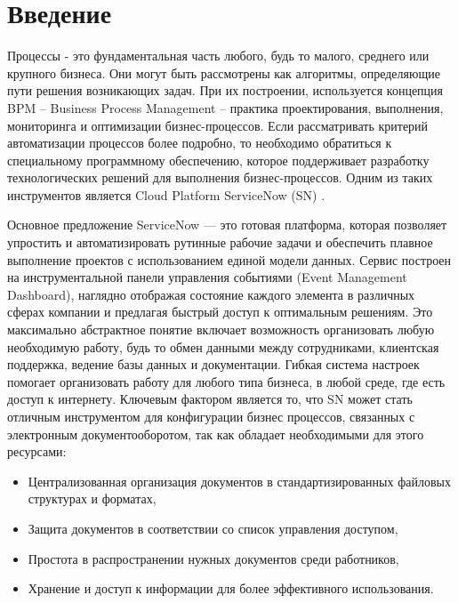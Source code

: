 \documentclass[14pt]{mmcs_article}
\begin{document}


\renewcommand{\contentsname}{Оглавление}

\tableofcontents

\newpage
{}
\section*{Введение} 
Процессы - это фундаментальная часть любого, будь то малого, среднего или крупного бизнеса. Они могут быть рассмотрены как алгоритмы, определяющие пути решения возникающих задач. При их построении, используется концепция BPM – Business Process Management – практика проектирования, выполнения, мониторинга и оптимизации бизнес-процессов.  Если рассматривать критерий автоматизации процессов более подробно, то необходимо обратиться к специальному программному обеспечению, которое поддерживает разработку технологических решений для выполнения бизнес-процессов. Одним из таких инструментов является Cloud Platform ServiceNow (SN) \cite{stud:b021}. 

Основное предложение ServiceNow — это готовая платформа, которая позволяет упростить и автоматизировать рутинные рабочие задачи и обеспечить плавное выполнение проектов с использованием единой модели данных. Сервис построен на инструментальной панели управления событиями (Event Management Dashboard), наглядно отображая состояние каждого элемента в различных сферах компании и предлагая быстрый доступ к оптимальным решениям. Это максимально абстрактное понятие включает возможность организовать любую необходимую работу, будь то обмен данными между сотрудниками, клиентская поддержка, ведение базы данных и документации. Гибкая система настроек помогает организовать работу для любого типа бизнеса, в любой среде, где есть доступ к интернету.
Ключевым фактором является то, что SN может стать отличным инструментом для конфигурации бизнес процессов, связанных с электронным документооборотом, так как обладает необходимыми для этого ресурсами:

\begin{itemize}
\item Централизованная организация документов в стандартизированных файловых структурах и форматах,
\item Защита документов в соответствии со список управления доступом,
\item Простота в распространении нужных документов среди работников,
\item Хранение и доступ к информации для более эффективного использования.
\end{itemize}
\end{document}
